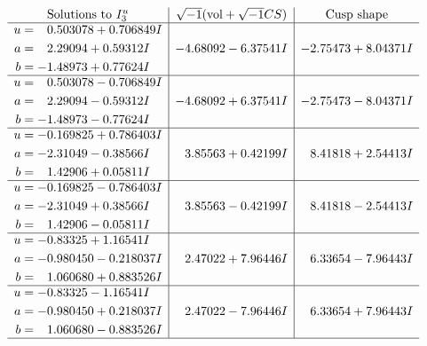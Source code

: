 \documentclass[1p]{elsarticle_modified}
\theoremstyle{definition}
\newcommand{\I}{\sqrt{-1}}
\begin{document}
$$\begin{array}{c|c|c}  
\text{Solutions to }I^u_{3}& \I (\text{vol} + \sqrt{-1}CS) & \text{Cusp shape}\\
 \hline 
\begin{aligned}
u &= \phantom{-}0.503078 + 0.706849 I \\
a &= \phantom{-}2.29094 + 0.59312 I \\
b &= -1.48973 + 0.77624 I\end{aligned}
 & -4.68092 - 6.37541 I & -2.75473 + 8.04371 I \\ \hline\begin{aligned}
u &= \phantom{-}0.503078 - 0.706849 I \\
a &= \phantom{-}2.29094 - 0.59312 I \\
b &= -1.48973 - 0.77624 I\end{aligned}
 & -4.68092 + 6.37541 I & -2.75473 - 8.04371 I \\ \hline\begin{aligned}
u &= -0.169825 + 0.786403 I \\
a &= -2.31049 - 0.38566 I \\
b &= \phantom{-}1.42906 + 0.05811 I\end{aligned}
 & \phantom{-}3.85563 + 0.42199 I & \phantom{-}8.41818 + 2.54413 I \\ \hline\begin{aligned}
u &= -0.169825 - 0.786403 I \\
a &= -2.31049 + 0.38566 I \\
b &= \phantom{-}1.42906 - 0.05811 I\end{aligned}
 & \phantom{-}3.85563 - 0.42199 I & \phantom{-}8.41818 - 2.54413 I \\ \hline\begin{aligned}
u &= -0.83325 + 1.16541 I \\
a &= -0.980450 - 0.218037 I \\
b &= \phantom{-}1.060680 + 0.883526 I\end{aligned}
 & \phantom{-}2.47022 + 7.96446 I & \phantom{-}6.33654 - 7.96443 I \\ \hline\begin{aligned}
u &= -0.83325 - 1.16541 I \\
a &= -0.980450 + 0.218037 I \\
b &= \phantom{-}1.060680 - 0.883526 I\end{aligned}
 & \phantom{-}2.47022 - 7.96446 I & \phantom{-}6.33654 + 7.96443 I\\
 \hline 
 \end{array}$$\newpage\newpage\renewcommand{\arraystretch}{1}
\end{document}
